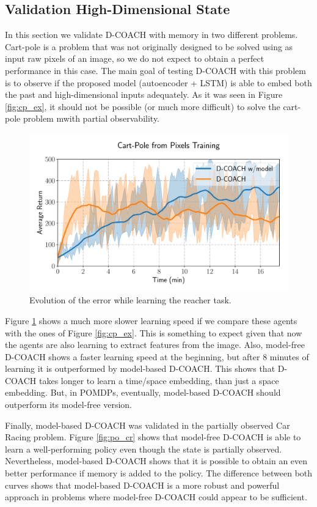 \subsection{Validation High-Dimensional State}
In this section we validate D-COACH with memory in two different problems. Cart-pole is a problem that was not originally designed to be solved using as input raw pixels of an image, so we do not expect to obtain a perfect performance in this case. The main goal of testing D-COACH with this problem is to observe if the proposed model (autoencoder + LSTM) is able to embed both the past and high-dimensional inputs adequately. As it was seen in Figure \ref{fig:cp_ex}, it should not be possible (or much more difficult) to solve the cart-pole problem mwith partial observability.

\begin{figure}[h]
    \centering
    \includegraphics[width=0.9\linewidth]{imagenes/cap3/cartpole_HD_model.pdf}
    \caption{Evolution of the error while learning the reacher task. }
    \label{fig:cp_hd}
\end{figure}

Figure \ref{fig:cp_hd} shows a much more slower learning speed if we compare these agents with the ones of Figure \ref{fig:cp_ex}. This is something to expect given that now the agents are also learning to extract features from the image. Also, model-free D-COACH shows a faster learning speed at the beginning, but after 8 minutes of learning it is outperformed by model-based D-COACH. This shows that D-COACH takes longer to learn a time/space embedding, than just a space embedding. But, in POMDPs, eventually, model-based D-COACH should outperform its model-free version.

Finally, model-based D-COACH was validated in the partially observed Car Racing problem. Figure \ref{fig:po_cr} shows that model-free D-COACH is able to learn a well-performing policy even though the state is partially observed. Nevertheless, model-based D-COACH shows that it is possible to obtain an even better performance if memory is added to the policy. The difference between both curves shows that model-based D-COACH is a more robust and powerful approach in problems where model-free D-COACH could appear to be sufficient.

